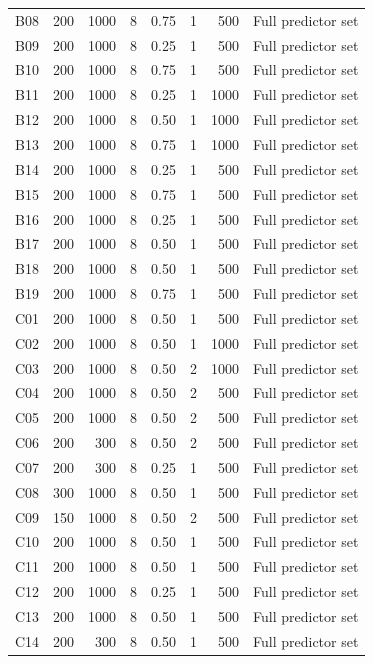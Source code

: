 \begin{longtable}[t]{lrrrrrrl}
B08 & 200 & 1000 & 8 & 0.75 & 1 & 500 & Full predictor set\\
B09 & 200 & 1000 & 8 & 0.25 & 1 & 500 & Full predictor set\\
B10 & 200 & 1000 & 8 & 0.75 & 1 & 500 & Full predictor set\\
B11 & 200 & 1000 & 8 & 0.25 & 1 & 1000 & Full predictor set\\
B12 & 200 & 1000 & 8 & 0.50 & 1 & 1000 & Full predictor set\\
B13 & 200 & 1000 & 8 & 0.75 & 1 & 1000 & Full predictor set\\
B14 & 200 & 1000 & 8 & 0.25 & 1 & 500 & Full predictor set\\
B15 & 200 & 1000 & 8 & 0.75 & 1 & 500 & Full predictor set\\
B16 & 200 & 1000 & 8 & 0.25 & 1 & 500 & Full predictor set\\
B17 & 200 & 1000 & 8 & 0.50 & 1 & 500 & Full predictor set\\
B18 & 200 & 1000 & 8 & 0.50 & 1 & 500 & Full predictor set\\
B19 & 200 & 1000 & 8 & 0.75 & 1 & 500 & Full predictor set\\
C01 & 200 & 1000 & 8 & 0.50 & 1 & 500 & Full predictor set\\
C02 & 200 & 1000 & 8 & 0.50 & 1 & 1000 & Full predictor set\\
C03 & 200 & 1000 & 8 & 0.50 & 2 & 1000 & Full predictor set\\
C04 & 200 & 1000 & 8 & 0.50 & 2 & 500 & Full predictor set\\
C05 & 200 & 1000 & 8 & 0.50 & 2 & 500 & Full predictor set\\
C06 & 200 & 300 & 8 & 0.50 & 2 & 500 & Full predictor set\\
C07 & 200 & 300 & 8 & 0.25 & 1 & 500 & Full predictor set\\
C08 & 300 & 1000 & 8 & 0.50 & 1 & 500 & Full predictor set\\
C09 & 150 & 1000 & 8 & 0.50 & 2 & 500 & Full predictor set\\
C10 & 200 & 1000 & 8 & 0.50 & 1 & 500 & Full predictor set\\
C11 & 200 & 1000 & 8 & 0.50 & 1 & 500 & Full predictor set\\
C12 & 200 & 1000 & 8 & 0.25 & 1 & 500 & Full predictor set\\
C13 & 200 & 1000 & 8 & 0.50 & 1 & 500 & Full predictor set\\
C14 & 200 & 300 & 8 & 0.50 & 1 & 500 & Full predictor set\\

\end{longtable}
